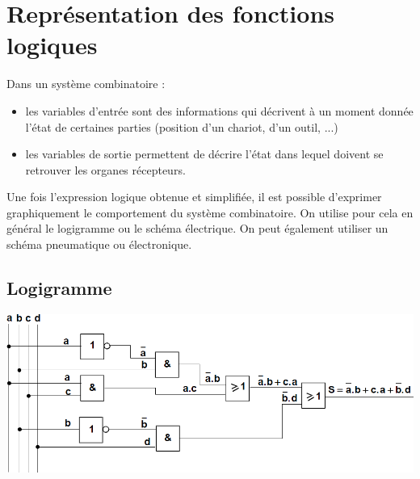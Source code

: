 \documentclass[11pt,oneside]{article}
\begin{document}
\section{Représentation des fonctions logiques}
Dans un système combinatoire : 
\begin{itemize}
\item les variables d'entrée sont des informations qui décrivent à un moment donnée l'état de certaines parties (position d'un chariot, d'un outil, ...)
\item les variables de sortie permettent de décrire l'état dans lequel doivent se retrouver les organes récepteurs. 
\end{itemize}

Une fois l'expression logique obtenue et simplifiée, il est possible d'exprimer graphiquement le comportement du système combinatoire. On utilise pour cela en général le logigramme ou le schéma électrique. On peut également utiliser un schéma pneumatique ou électronique.

\subsection{Logigramme}



\begin{center}
\includegraphics[width=.6\textwidth]{png/fig_17}
\end{center}
\end{document}
